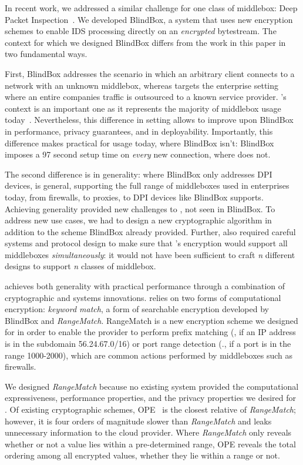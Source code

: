 In recent work, we addressed a similar challenge for one class of middlebox: Deep Packet Inspection~\cite{blindbox}.  
We developed BlindBox, a system that uses new encryption schemes to enable IDS processing directly on an \emph{encrypted} bytestream. 
The context for which we designed BlindBox differs from the work in this paper in two fundamental ways.

First, BlindBox addresses the scenario in which an arbitrary client connects to a network with an unknown middlebox, whereas \sys targets the enterprise setting where an entire companies traffic is outsourced to a known service provider.
\sys's context is an important one as it represents the majority of middlebox usage today~\cite{need-citation}. 
Nevertheless, this difference in setting allows \sys to improve upon BlindBox in performance, privacy guarantees, and in deployability. 
Importantly, this difference makes \sys practical for usage today, where BlindBox isn't: BlindBox imposes a 97 second setup time on {\it every} new connection, where \sys does not.

The second difference is in generality: where BlindBox only addresses DPI devices, \sys is general, supporting the full range of middleboxes used in enterprises today, from firewalls, to proxies, to DPI devices like BlindBox supports.
Achieving generality provided new challenges to \sys, not seen in BlindBox. 
To address new use cases, we had to design a new cryptographic algorithm in addition to the scheme BlindBox already provided. 
Further, \sys also required careful systems and protocol design to make sure that \sys's encryption would support all middleboxes {\it simultaneously}: it would not have been sufficient to craft {\it n} different designs to support {\it n} classes of middlebox.


    \sys achieves both generality with practical performance through a combination of cryptographic and systems innovations.
    \sys relies on two forms of computational encryption: {\it keyword match}, a form of searchable encryption developed by BlindBox  and {\it RangeMatch}.
    RangeMatch is a new encryption scheme we designed for \sys in order to enable the provider to perform prefix matching (\eg{}, if an IP address is in the subdomain 56.24.67.0/16) or port range detection (\eg., if a port is in the range 1000-2000), which are common actions performed by middleboxes such as firewalls. 

    We designed {\it RangeMatch} because no existing system provided the computational expressiveness, performance properties, and the privacy properties we desired for \sys.
    Of existing cryptographic schemes, OPE~\cite{cryptdb} is the closest relative of {\it RangeMatch}; however, it is four orders of magnitude slower than {\it RangeMatch} and leaks unnecessary information to the cloud provider.
    Where {\em RangeMatch} only reveals whether or not a value lies within a pre-determined range, OPE reveals the total ordering among all encrypted values, whether they lie within a range or not.

